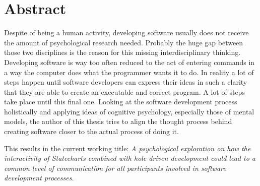 \chapter{Abstract}
Despite of being a human activity, developing software usually does not receive the amount of psychological research needed. Probably the huge gap between those two disciplines is the reason for this missing interdisciplinary thinking. Developing software is way too often reduced to the act of entering commands in a way the computer does what the programmer wants it to do. In reality a lot of steps happen until software developers can express their ideas in such a clarity that they are able to create an executable and correct program. A lot of steps take place until this final one. Looking at the software development process holistically and applying ideas of cognitive psychology, especially those of mental models, the author of this thesis tries to align the thought process behind creating software closer to the actual process of doing it.

This results in the current working title: \emph{A psychological exploration on how the interactivity of Statecharts combined with hole driven development could lead to a common level of communication for all participants involved in software development processes.}